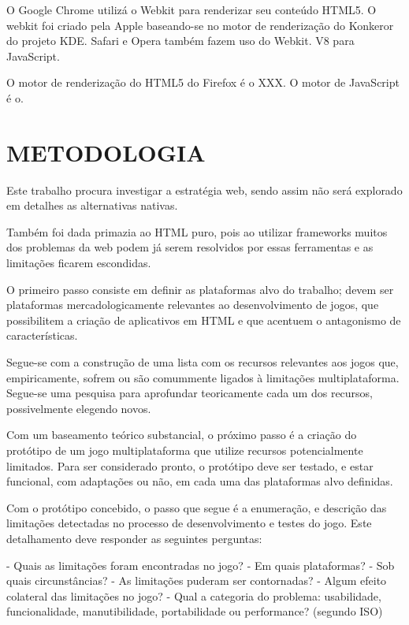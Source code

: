 \documentclass[11pt,a4paper]{article}
\begin{document}
O Google Chrome utilizá o Webkit para renderizar seu conteúdo HTML5. O
webkit foi criado pela Apple baseando-se no motor de renderização do
Konkeror do projeto KDE. Safari e Opera também fazem uso do Webkit. V8
para JavaScript.

O motor de renderização do HTML5 do Firefox é o XXX. O motor de
JavaScript é o.


\section{METODOLOGIA}

Este trabalho procura investigar a estratégia web, sendo assim não
será explorado em detalhes as alternativas nativas.

Também foi dada primazia ao HTML puro, pois ao utilizar frameworks
muitos dos problemas da web podem já serem resolvidos por essas
ferramentas e as limitações ficarem escondidas.


O primeiro passo consiste em definir as plataformas alvo do trabalho;
devem ser plataformas mercadologicamente relevantes ao desenvolvimento
de jogos, que possibilitem a criação de aplicativos em HTML e que
acentuem o antagonismo de características.

Segue-se com a construção de uma lista com os recursos relevantes
aos jogos que, empiricamente, sofrem ou são comummente ligados à
limitações multiplataforma. Segue-se uma pesquisa para aprofundar
teoricamente cada um dos recursos, possivelmente elegendo novos.

Com um baseamento teórico substancial, o próximo passo é a criação
do protótipo de um jogo multiplataforma que utilize recursos
potencialmente limitados. Para ser considerado pronto, o protótipo deve
ser testado, e estar funcional, com adaptações ou não, em cada uma
das plataformas alvo definidas.

Com o protótipo concebido, o passo que segue é a enumeração, e
descrição das limitações detectadas no processo de desenvolvimento e
testes do jogo. Este detalhamento deve responder as seguintes perguntas:

- Quais as limitações foram encontradas no jogo?
- Em quais plataformas?
- Sob quais circunstâncias?
- As limitações puderam ser contornadas?
- Algum efeito colateral das limitações no jogo?
- Qual a categoria do problema: usabilidade, funcionalidade,
manutibilidade, portabilidade ou performance? (segundo ISO) %

\end{document}
